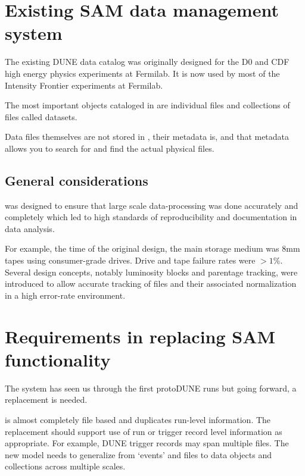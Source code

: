 \label{ch:sam:catalog}

\section{Existing SAM data management system}

The existing DUNE data catalog  was originally designed for the D0 and CDF high energy physics experiments at Fermilab.  It is now used by most of the Intensity Frontier experiments at Fermilab. 

The most important objects cataloged in  are individual files and collections of files called
datasets.

Data files themselves are not stored in , their metadata is, and that metadata allows you to search for and find the actual physical files.

\subsection{General considerations}

 was designed to ensure that large scale data-processing was done accurately and completely  which led to  high standards of reproducibility and documentation in data analysis.

For example, the time of the original design, the main storage medium was 8mm tapes using consumer-grade drives.  Drive and tape failure rates were $> 1$\%.  Several  design concepts, notably luminosity blocks and parentage tracking, were introduced to allow accurate tracking of files and their associated normalization in a high error-rate environment. 

\section{Requirements in replacing SAM functionality}

The  system has seen us through the first protoDUNE runs but going forward, a replacement is needed. 



  is almost completely file based and duplicates run-level information.  The replacement should support use of run or trigger record level information as appropriate. 
For example,  DUNE trigger records may span multiple files. The new model needs to generalize from `events' and files to data objects and collections across multiple scales. 

